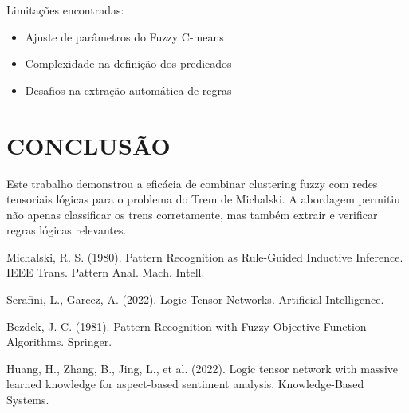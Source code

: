 \documentclass[a4paper,twoside]{article}
\begin{document}
Limita\c{c}\~oes encontradas:
\begin{itemize}
    \item Ajuste de par\^ametros do Fuzzy C-means
    \item Complexidade na defini\c{c}\~ao dos predicados
    \item Desafios na extra\c{c}\~ao autom\'atica de regras
\end{itemize}

\section{\uppercase{Conclus\~ao}}
\label{sec:conclusion}

Este trabalho demonstrou a efic\'acia de combinar clustering fuzzy com redes tensoriais l\'ogicas para o problema do Trem de Michalski. A abordagem permitiu n\~ao apenas classificar os trens corretamente, mas tamb\'em extrair e verificar regras l\'ogicas relevantes.

\begin{thebibliography}{99}

Michalski, R. S. (1980). Pattern Recognition as Rule-Guided Inductive Inference. IEEE Trans. Pattern Anal. Mach. Intell.

Serafini, L., Garcez, A. (2022). Logic Tensor Networks. Artificial Intelligence.

Bezdek, J. C. (1981). Pattern Recognition with Fuzzy Objective Function Algorithms. Springer.

Huang, H., Zhang, B., Jing, L., et al. (2022). Logic tensor network with massive learned knowledge for aspect-based sentiment analysis. Knowledge-Based Systems.

\end{thebibliography}
\end{document}
